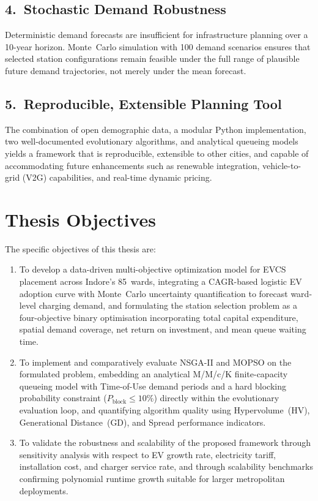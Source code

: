 \subsection*{4.~Stochastic Demand Robustness}
Deterministic demand forecasts are insufficient for infrastructure
planning over a 10-year horizon. Monte~Carlo simulation with 100
demand scenarios ensures that selected station configurations remain
feasible under the full range of plausible future demand trajectories,
not merely under the mean forecast.

\subsection*{5.~Reproducible, Extensible Planning Tool}
The combination of open demographic data, a modular Python
implementation, two well-documented evolutionary algorithms, and
analytical queueing models yields a framework that is reproducible,
extensible to other cities, and capable of accommodating future
enhancements such as renewable integration, vehicle-to-grid (V2G)
capabilities, and real-time dynamic pricing.

\section{Thesis Objectives}
\label{Chapter_1_Objectives}

\noindent The specific objectives of this thesis are:

\begin{enumerate}
  \item To develop a data-driven multi-objective optimization model for
        EVCS placement across Indore's 85~wards, integrating a
        CAGR-based logistic EV adoption curve with Monte~Carlo
        uncertainty quantification to forecast ward-level charging
        demand, and formulating the station selection problem as a
        four-objective binary optimisation incorporating total capital
        expenditure, spatial demand coverage, net return on investment,
        and mean queue waiting time.

  \item To implement and comparatively evaluate NSGA-II and MOPSO on
        the formulated problem, embedding an analytical M/M/c/K
        finite-capacity queueing model with Time-of-Use demand periods
        and a hard blocking probability constraint
        ($P_{\text{block}} \leq 10\%$) directly within the evolutionary
        evaluation loop, and quantifying algorithm quality using
        Hypervolume~(HV), Generational Distance~(GD), and Spread
        performance indicators.

  \item To validate the robustness and scalability of the proposed
        framework through sensitivity analysis with respect to EV
        growth rate, electricity tariff, installation cost, and charger
        service rate, and through scalability benchmarks confirming
        polynomial runtime growth suitable for larger metropolitan
        deployments.
\end{enumerate}

